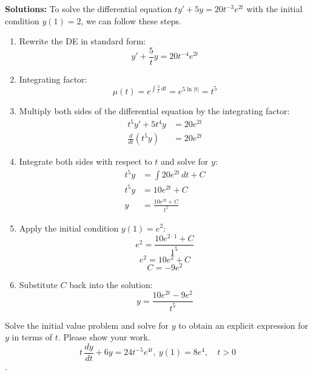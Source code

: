 \ifnum {} {\color{DarkBlue} 
\textbf{Solutions:}
To solve the differential equation \( t y' + 5 y = 20 t^{-3} e^{2t} \) with the initial condition \( y(1) = 2 \), we can follow these steps.
\begin{enumerate}
    \item Rewrite the DE in standard form:
   \[ y' + \frac{5}{t} y = 20 t^{-4} e^{2t} \]
   \item Integrating factor:
   \[ \mu(t) = e^{\int \frac{5}{t} \, dt} = e^{5 \ln |t|} = t^5 \]
   \item Multiply both sides of the differential equation by the integrating factor:
   \begin{align*}
       t^5 y' + 5 t^4 y &= 20 e^{2t} \\
       \frac{d}{dt} (t^5 y) &= 20 e^{2t}
   \end{align*} 
   \item Integrate both sides with respect to \( t \) and solve for $y$:
   \begin{align}
       t^5 y &= \int 20 e^{2t} \, dt + C \\
       t^5 y &= 10 e^{2t} + C \\
        y &= \frac{10 e^{2t} + C}{t^5} 
   \end{align} 
   \item Apply the initial condition \( y(1) = e^2 \):
   \[ e^2 = \frac{10 e^{2 \cdot 1} + C}{1^5} \]
   \[ e^2 = 10 e^2 + C \]
   \[ C = - 9 e^2 \]
   \item Substitute \( C \) back into the solution:
   \[ y = \frac{10 e^{2t} - 9 e^2}{t^5} \]
\end{enumerate}
} 
\else 
\newpage
\fi
\fi   






\ifnum {}
\question[4] 
Solve the initial value problem and solve for $y$ to obtain an explicit expression for $y$ in terms of $t$. Please show your work.
$$\displaystyle t\,\frac{dy}{dt} + 6y =  24 t^{-5}e^{4t}, \ y(1) = 8e^4, \quad t > 0$$.

